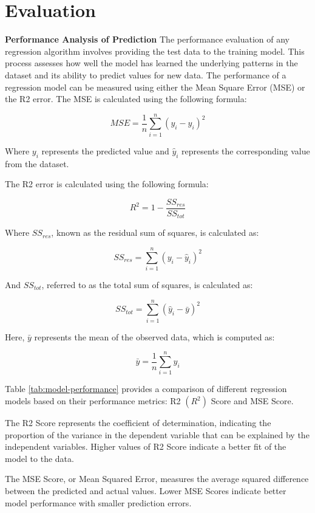 \section{Evaluation}

\textbf{Performance Analysis of Prediction}
The performance evaluation of any regression algorithm involves providing the test data to the training model. This process assesses how well the model has learned the underlying patterns in the dataset and its ability to predict values for new data. The performance of a regression model can be measured using either the Mean Square Error (MSE) or the R2 error. \cite{krishna:2018}
The MSE is calculated using the following formula:

\[MSE = \frac{1}{n}\sum_{i=1}^{n}(y_i - \hat{y}_i)^2\]

Where \(y_i\) represents the predicted value and \(\hat{y}_i\) represents the corresponding value from the dataset.

The R2 error is calculated using the following formula:

\[R^2 = 1 - \frac{SS_{res}}{SS_{tot}}\]

Where \(SS_{res}\), known as the residual sum of squares, is calculated as:

\[SS_{res} = \sum_{i=1}^{n}(y_i - \hat{y}_i)^2\]

And \(SS_{tot}\), referred to as the total sum of squares, is calculated as:

\[SS_{tot} = \sum_{i=1}^{n}(\hat{y}_i - \bar{y})^2\]

Here, \(\bar{y}\) represents the mean of the observed data, which is computed as:

\[\bar{y} = \frac{1}{n}\sum_{i=1}^{n}y_i\]

Table \ref{tab:model-performance} provides a comparison of different regression models based on their performance metrics: R2 $(R^2)$ Score and MSE Score.

The R2 Score represents the coefficient of determination, indicating the proportion of the variance in the dependent variable that can be explained by the independent variables. Higher values of R2 Score indicate a better fit of the model to the data.

The MSE Score, or Mean Squared Error, measures the average squared difference between the predicted and actual values. Lower MSE Scores indicate better model performance with smaller prediction errors.


